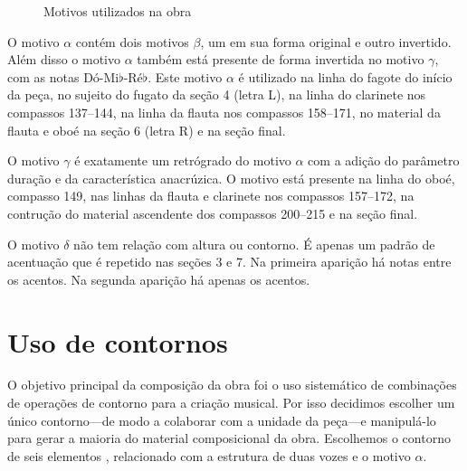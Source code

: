 \begin{figure}
  \centering


  \caption{Motivos utilizados na obra}
  \label{fig:motivos-utilizados}
\end{figure}

O motivo $\alpha$ contém dois motivos $\beta$, um em sua forma
original e outro invertido. Além disso o motivo $\alpha$ também está
presente de forma invertida no motivo $\gamma$, com as notas
Dó-Mi$\flat$-Ré$\flat$. Este motivo $\alpha$ é utilizado na linha do
fagote do início da peça, no sujeito do fugato da seção 4 (letra L),
na linha do clarinete nos compassos 137--144, na linha da flauta nos
compassos 158--171, no material da flauta e oboé na seção 6 (letra R)
e na seção final.

O motivo $\gamma$ é exatamente um retrógrado do motivo $\alpha$ com a
adição do parâmetro duração e da característica anacrúzica. O motivo
está presente na linha do oboé, compasso 149, nas linhas da flauta e
clarinete nos compassos 157--172, na contrução do material ascendente
dos compassos 200--215 e na seção final.

O motivo $\delta$ não tem relação com altura ou contorno. É apenas um
padrão de acentuação que é repetido nas seções 3 e 7. Na primeira
aparição há notas  entre os acentos. Na segunda aparição
há apenas os acentos.

\section{Uso de contornos}
\label{sec:uso-de-contornos}

O objetivo principal da composição da obra \obra{} foi o uso
sistemático de combinações de operações de contorno para a criação
musical. Por isso decidimos escolher um único contorno---de modo a
colaborar com a unidade da peça---e manipulá-lo para gerar a maioria
do material composicional da obra. Escolhemos o contorno de seis
elementos \contpr{}, relacionado com a estrutura de duas vozes e o
motivo $\alpha$.

